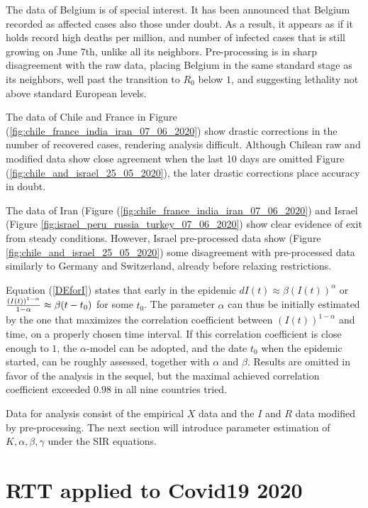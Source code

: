 \documentclass{article}
\begin{document}
The data of Belgium is of special interest. It has been announced that Belgium recorded as affected cases also those under doubt. As a result, it appears as if it holds record high deaths per million, and number of infected cases that is still growing on June 7th, unlike all its neighbors. Pre-processing is in sharp disagreement with the raw data, placing Belgium in the same standard stage as its neighbors, well past the transition to $R_0$ below $1$, and suggesting lethality not above standard European levels. 

The data of Chile and France in Figure (\ref{fig:chile_france_india_iran_07_06_2020}) show drastic corrections in the number of recovered cases, rendering analysis difficult. Although Chilean raw and modified data show close agreement when the last 10 days are omitted Figure (\ref{fig:chile_and_israel_25_05_2020}), the later drastic corrections place accuracy in doubt.

The data of Iran (Figure (\ref{fig:chile_france_india_iran_07_06_2020}) and Israel (Figure \ref{fig:israel_peru_russia_turkey_07_06_2020}) show clear evidence of exit from steady conditions. However, Israel pre-processed data show (Figure \ref{fig:chile_and_israel_25_05_2020}) some disagreement with pre-processed data similarly to Germany and Switzerland, already before relaxing restrictions.

\bigskip

Equation (\ref{DEforI}) states that early in the epidemic $dI(t) \approx \beta (I(t))^\alpha$ or ${{(I(t))^{1-\alpha}} \over  {1-\alpha}} \approx \beta (t-t_0)$ for some $t_0$.
The parameter $\alpha$ can thus be initially estimated by the one that maximizes the correlation coefficient between $(I(t))^{1-\alpha}$ and time, on a properly chosen time interval. If this correlation coefficient is close enough to $1$, the $\alpha$-model can be adopted, and the date $t_0$ when the epidemic started, can be roughly assessed, together with $\alpha$ and $\beta$. Results are omitted in favor of the analysis in the sequel, but
the maximal achieved correlation coefficient exceeded $0.98$ in all nine countries tried.

\bigskip

Data for analysis consist of the empirical $X$ data and the $I$ and $R$ data modified by pre-processing. The next section will introduce parameter estimation of $K,\alpha, \beta,\gamma$ under the SIR equations.

\section{RTT applied to Covid19 2020} \label{RTTsection}
\end{document}
